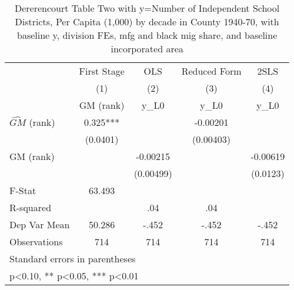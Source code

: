\begin{table}[htbp]\centering
\def\sym#1{\ifmmode^{#1}\else\(^{#1}\)\fi}
\caption{Dererencourt Table Two with y=Number of Independent School Districts, Per Capita (1,000) by decade in County 1940-70, with baseline y, division FEs, mfg and black mig share, and baseline incorporated area}
\begin{tabular}{l*{4}{c}}
\toprule
                    & First Stage   &         OLS   &Reduced Form   &        2SLS   \\
                    &\multicolumn{1}{c}{(1)}&\multicolumn{1}{c}{(2)}&\multicolumn{1}{c}{(3)}&\multicolumn{1}{c}{(4)}\\
                    &\multicolumn{1}{c}{GM  (rank)}&\multicolumn{1}{c}{y\_L0}&\multicolumn{1}{c}{y\_L0}&\multicolumn{1}{c}{y\_L0}\\
\midrule
$\hat{GM}$ (rank)   &       0.325***&               &    -0.00201   &               \\
                    &    (0.0401)   &               &   (0.00403)   &               \\
\addlinespace
GM  (rank)          &               &    -0.00215   &               &    -0.00619   \\
                    &               &   (0.00499)   &               &    (0.0123)   \\
\midrule
F-Stat              &      63.493   &               &               &               \\
R-squared           &               &         .04   &         .04   &               \\
Dep Var Mean        &      50.286   &       -.452   &       -.452   &       -.452   \\
Observations        &         714   &         714   &         714   &         714   \\
\bottomrule
\multicolumn{5}{l}{\footnotesize Standard errors in parentheses}\\
\multicolumn{5}{l}{\footnotesize * p<0.10, ** p<0.05, *** p<0.01}\\
\end{tabular}
\end{table}
